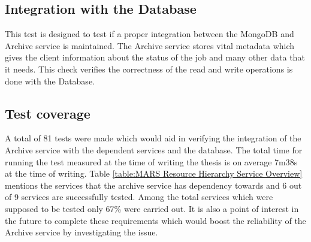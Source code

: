\subsection{Integration with the Database}
This test is designed to test if a proper integration between the MongoDB and Archive service is maintained. The Archive service stores vital metadata
which gives the client information about the status of the job and many other data that it needs. This check verifies the correctness of the read and write 
operations is done with the Database. 

\subsection{Test coverage}
A total of 81 tests were made which would aid in verifying the integration of the Archive service with the dependent services and the database. The 
total time for running the test measured at the time of writing the thesis is on average 7m38s at the time of writing. Table \ref{table:MARS Resource Hierarchy Service Overview}
mentions the services that the archive service has dependency towards and 6 out of 9 services are successfully tested. Among the total services 
which were supposed to be tested only 67\%  were carried out. It is also a point of interest in the future to complete these requirements which would boost the
reliability of the Archive service by investigating the issue. 
